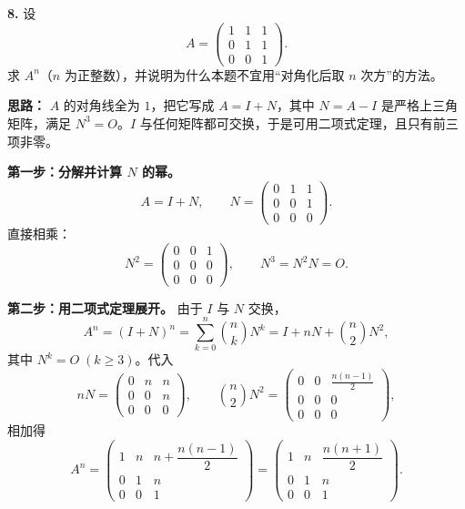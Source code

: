 \else \answerarea[10] \fi%

\textbf{8.} 设
\[
A=\begin{pmatrix}1&1&1\\0&1&1\\0&0&1\end{pmatrix}.
\]
求 \(A^n\)（\(n\) 为正整数），并说明为什么本题不宜用“对角化后取 \(n\) 次方”的方法。

\ifshowsolutions%
\textbf{思路：} \(A\) 的对角线全为 \(1\)，把它写成 \(A=I+N\)，其中 \(N=A-I\) 是严格上三角矩阵，满足 \(N^3=O\)。\(I\) 与任何矩阵都可交换，于是可用二项式定理，且只有前三项非零。

\textbf{第一步：分解并计算 \(N\) 的幂。}
\[
A=I+N,\qquad
N=\begin{pmatrix}0&1&1\\0&0&1\\0&0&0\end{pmatrix}.
\]
直接相乘：
\[
N^2=\begin{pmatrix}0&0&1\\0&0&0\\0&0&0\end{pmatrix},
\qquad
N^3=N^2N=O.
\]

\textbf{第二步：用二项式定理展开。}
由于 \(I\) 与 \(N\) 交换，
\[
A^n=(I+N)^n=\sum_{k=0}^{n}\binom{n}{k}N^k
=I+nN+\binom{n}{2}N^2,
\]
其中 \(N^k=O\;(k\ge3)\)。代入
\[
nN=\begin{pmatrix}0&n&n\\0&0&n\\0&0&0\end{pmatrix},
\qquad
\binom{n}{2}N^2=\begin{pmatrix}0&0&\frac{n(n-1)}{2}\\0&0&0\\0&0&0\end{pmatrix},
\]
相加得
\[
A^n=
\begin{pmatrix}
1&n&n+\dfrac{n(n-1)}{2}\\[4pt]
0&1&n\\[4pt]
0&0&1
\end{pmatrix}
=
\begin{pmatrix}
1&n&\dfrac{n(n+1)}{2}\\[4pt]
0&1&n\\[4pt]
0&0&1
\end{pmatrix}.
\]

